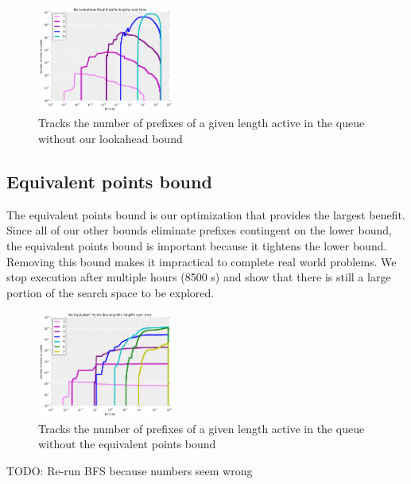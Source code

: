 \begin{figure}[t!]
\begin{center}
\includegraphics[width=0.4\textwidth]{figs/lookahead_prefixes.png}
\end{center}
\caption{Tracks the number of prefixes of a given length active in the queue without our lookahead bound}
\label{fig:lookahead-prefixes}
\end{figure}

\subsection{Equivalent points bound}

The equivalent points bound is our optimization that provides the largest benefit.
Since all of our other bounds eliminate prefixes contingent on the lower bound, the equivalent points bound is important because it tightens the lower bound.
Removing this bound makes it impractical to complete real world problems.
We stop execution after multiple hours (8500 s) and show that there is still a large portion of the search space to be explored.

\begin{figure}[t!]
\begin{center}
\includegraphics[width=0.4\textwidth]{figs/equivalent_prefixes.png}
\end{center}
\caption{Tracks the number of prefixes of a given length active in the queue without the equivalent points bound}
\label{fig:equivalent-prefixes}
\end{figure}

TODO: Re-run BFS because numbers seem wrong

